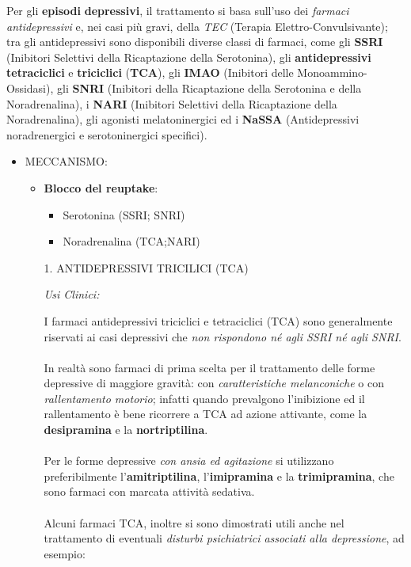 Per gli \textbf{episodi} \textbf{depressivi}, il trattamento si basa
sull'uso dei \emph{farmaci antidepressivi} e, nei casi più gravi, della
\emph{TEC} (Terapia Elettro-Convulsivante); tra gli antidepressivi sono
disponibili diverse classi di farmaci, come gli \textbf{SSRI} (Inibitori
Selettivi della Ricaptazione della Serotonina), gli
\textbf{antidepressivi tetraciclici} e \textbf{triciclici}
(\textbf{TCA}), gli \textbf{IMAO} (Inibitori delle Monoammino-Ossidasi),
gli \textbf{SNRI} (Inibitori della Ricaptazione della Serotonina e della
Noradrenalina), i \textbf{NARI} (Inibitori Selettivi della Ricaptazione
della Noradrenalina), gli agonisti melatoninergici ed i \textbf{NaSSA}
(Antidepressivi noradrenergici e serotoninergici specifici).

\begin{itemize}
\item MECCANISMO:

\begin{itemize}
\item
  \textbf{Blocco del reuptake}:

  \begin{itemize}
  \item
    Serotonina (SSRI; SNRI)
  \item
    Noradrenalina (TCA;NARI)
  \end{itemize}
\end{itemize}

\begin{itemize}
\item[1.] ANTIDEPRESSIVI TRICILICI (TCA)

\emph{\emph{Usi Clinici:}}

I farmaci antidepressivi triciclici e tetraciclici (TCA) sono
generalmente riservati ai casi depressivi che \emph{non rispondono né
agli SSRI né agli SNRI}.
\\\\
In realtà sono farmaci di prima scelta per il trattamento delle forme
depressive di maggiore gravità: con \emph{caratteristiche melanconiche}
o con \emph{rallentamento motorio}; infatti quando prevalgono
l'inibizione ed il rallentamento è bene ricorrere a TCA ad azione
attivante, come la \textbf{desipramina} e la \textbf{nortriptilina}.
\\\\
Per le forme depressive \emph{con ansia ed agitazione} si utilizzano
preferibilmente l'\textbf{amitriptilina}, l'\textbf{imipramina} e la
\textbf{trimipramina}, che sono farmaci con marcata attività sedativa.
\\\\
Alcuni farmaci TCA, inoltre si sono dimostrati utili anche nel
trattamento di eventuali \emph{disturbi psichiatrici associati alla
depressione}, ad esempio:


\end{itemize}
\end{itemize}
